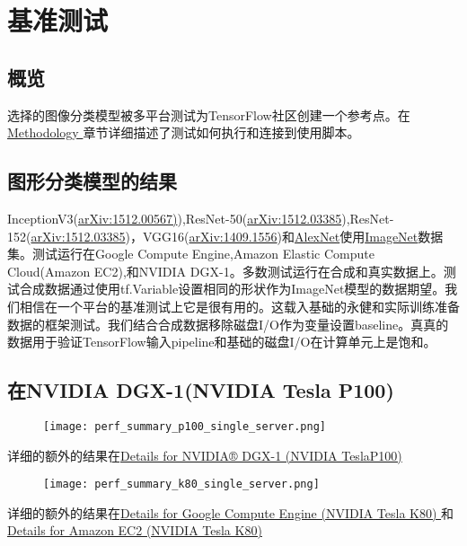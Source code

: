 \section{基准测试}
\subsection{概览}
选择的图像分类模型被多平台测试为TensorFlow社区创建一个参考点。在\href{https://www.tensorflow.org/performance/benchmarks#methodology}{Methodology }章节详细描述了测试如何执行和连接到使用脚本。
\subsection{图形分类模型的结果}
InceptionV3(\href{https://arxiv.org/abs/1512.00567}{arXiv:1512.00567)}),ResNet-50(\href{https://arxiv.org/abs/1512.03385}{arXiv:1512.03385}),ResNet-152(\href{https://arxiv.org/abs/1512.03385}{arXiv:1512.03385})，VGG16(\href{https://arxiv.org/abs/1409.1556}{arXiv:1409.1556})和\href{http://papers.nips.cc/paper/4824-imagenet-classification-with-deep-convolutional-neural-networks.pdf}{AlexNet}使用\href{http://www.image-net.org/}{ImageNet}数据集。测试运行在Google Compute Engine,Amazon Elastic Compute Cloud(Amazon EC2),和NVIDIA DGX-1。多数测试运行在合成和真实数据上。测试合成数据通过使用tf.Variable设置相同的形状作为ImageNet模型的数据期望。我们相信在一个平台的基准测试上它是很有用的。这载入基础的永健和实际训练准备数据的框架测试。我们结合合成数据移除磁盘I/O作为变量设置baseline。真真的数据用于验证TensorFlow输入pipeline和基础的磁盘I/O在计算单元上是饱和。
\subsection{在NVIDIA DGX-1(NVIDIA Tesla P100)}
\begin{figure}[H]
	\centering
	\texttt{[image: perf\_summary\_p100\_single\_server.png]}
\end{figure}
详细的额外的结果在\href{https://www.tensorflow.org/performance/benchmarks#details_for_nvidia_dgx-1tm_nvidia_tesla_p100}{Details for NVIDIA® DGX-1 (NVIDIA TeslaP100)}
\begin{figure}[H]
	\centering
	\texttt{[image: perf\_summary\_k80\_single\_server.png]}
\end{figure}
详细的额外的结果在\href{https://www.tensorflow.org/performance/benchmarks#details_for_google_compute_engine_nvidia_tesla_k80}{Details for Google Compute Engine (NVIDIA Tesla K80) }和\href{https://www.tensorflow.org/performance/benchmarks#details_for_amazon_ec2_nvidia_tesla_k80}{ Details for Amazon EC2 (NVIDIA Tesla K80) }
